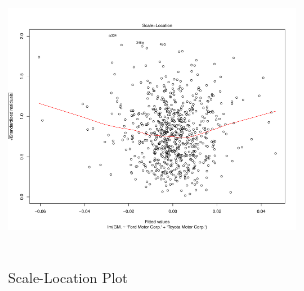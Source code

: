 \begin{figure}
\includegraphics[height=3in, width=3in]{scale-location}
\caption{Scale-Location Plot}
\end{figure}






